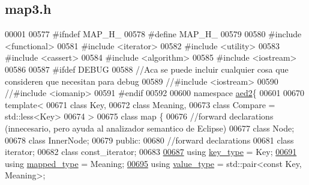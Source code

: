 \hypertarget{map3_8h_source}{}\subsection{map3.\+h}

\begin{DoxyCode}
00001 
00577 \textcolor{preprocessor}{#ifndef MAP\_H\_}
00578 \textcolor{preprocessor}{#define MAP\_H\_}
00579 
00580 \textcolor{preprocessor}{#include <functional>}
00581 \textcolor{preprocessor}{#include <iterator>}
00582 \textcolor{preprocessor}{#include <utility>}
00583 \textcolor{preprocessor}{#include <cassert>}
00584 \textcolor{preprocessor}{#include <algorithm>}
00585 \textcolor{preprocessor}{#include <iostream>}
00586 
00587 \textcolor{preprocessor}{#ifdef DEBUG}
00588 \textcolor{comment}{//Aca se puede incluir cualquier cosa que consideren que necesitan para debug}
00589 \textcolor{comment}{//#include <iostream>}
00590 \textcolor{comment}{//#include <iomanip>}
00591 \textcolor{preprocessor}{#endif}
00592 
00600 \textcolor{keyword}{namespace }\hyperlink{namespaceaed2}{aed2}\{
00601 
00670 \textcolor{keyword}{template}<
00671   \textcolor{keyword}{class }Key,
00672   \textcolor{keyword}{class }Meaning,
00673   \textcolor{keyword}{class }Compare = std::less<Key>
00674 >
00675 \textcolor{keyword}{class }map \{
00676     \textcolor{comment}{//forward declarations (innecesario, pero ayuda al analizador semantico de Eclipse)}
00677     \textcolor{keyword}{class }Node;
00678     \textcolor{keyword}{class }InnerNode;
00679 \textcolor{keyword}{public}:
00680     \textcolor{comment}{//forward declarations}
00681     \textcolor{keyword}{class }iterator;
00682     \textcolor{keyword}{class }const\_iterator;
00683 
\hyperlink{classaed2_1_1map_a4273e8812e7105a618df58a2c8b72b7d_a4273e8812e7105a618df58a2c8b72b7d}{00687}     \textcolor{keyword}{using} \hyperlink{classaed2_1_1map_a4273e8812e7105a618df58a2c8b72b7d_a4273e8812e7105a618df58a2c8b72b7d}{key\_type} = Key;
\hyperlink{classaed2_1_1map_aa3e34bf624f3009884a71b18f4ddae40_aa3e34bf624f3009884a71b18f4ddae40}{00691}     \textcolor{keyword}{using} \hyperlink{classaed2_1_1map_aa3e34bf624f3009884a71b18f4ddae40_aa3e34bf624f3009884a71b18f4ddae40}{mapped\_type} = Meaning;
\hyperlink{classaed2_1_1map_a719db98e0ff9a837610f76be33264680_a719db98e0ff9a837610f76be33264680}{00695}     \textcolor{keyword}{using} \hyperlink{classaed2_1_1map_a719db98e0ff9a837610f76be33264680_a719db98e0ff9a837610f76be33264680}{value\_type} = std::pair<const Key, Meaning>;

\end{DoxyCode}
